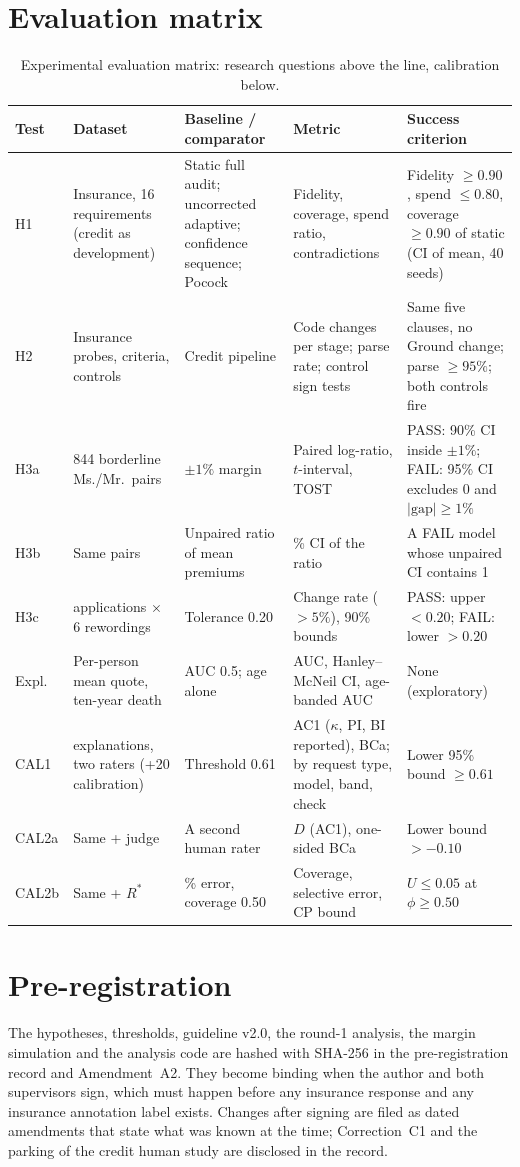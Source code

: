 \section{Evaluation matrix}
\begin{table}[H]
\centering
\caption{Experimental evaluation matrix: research questions above the line, calibration below.}
\label{tab:matrix}
\scriptsize
\begin{tabularx}{\textwidth}{@{}l>{\raggedright\arraybackslash}X>{\raggedright\arraybackslash}X>{\raggedright\arraybackslash}X>{\raggedright\arraybackslash}X@{}}
\toprule
Test & Dataset & Baseline / comparator & Metric & Success criterion \\
\midrule
H1 & Insurance, 16 requirements (credit as development) & Static full audit; uncorrected adaptive; confidence sequence; Pocock & Fidelity, coverage, spend ratio, contradictions & Fidelity $\ge0.90$, spend $\le0.80$, coverage $\ge0.90$ of static (CI of mean, 40 seeds) \\
H2 & Insurance probes, criteria, controls & Credit pipeline & Code changes per stage; parse rate; control sign tests & Same five clauses, no Ground change; parse $\ge95\%$; both controls fire \\
H3a & 2{,}844 borderline Ms./Mr.\ pairs & $\pm1\%$ margin & Paired log-ratio, $t$-interval, TOST & PASS: 90\% CI inside $\pm1\%$; FAIL: 95\% CI excludes 0 and $|\text{gap}|\ge1\%$ \\
H3b & Same pairs & Unpaired ratio of mean premiums & 95\% CI of the ratio & A FAIL model whose unpaired CI contains 1 \\
H3c & 725 applications $\times$ 6 rewordings & Tolerance 0.20 & Change rate ($>5\%$), 90\% bounds & PASS: upper $<0.20$; FAIL: lower $>0.20$ \\
Expl. & Per-person mean quote, ten-year death & AUC 0.5; age alone & AUC, Hanley--McNeil CI, age-banded AUC & None (exploratory) \\
\midrule
CAL1 & 240 explanations, two raters (+20 calibration) & Threshold 0.61 & AC1 ($\kappa$, PI, BI reported), BCa; by request type, model, band, check & Lower 95\% bound $\ge0.61$ \\
CAL2a & Same + judge & A second human rater & $D$ (AC1), one-sided BCa & Lower bound $>-0.10$ \\
CAL2b & Same + $R^{*}$ & 5\% error, coverage 0.50 & Coverage, selective error, CP bound & $U\le0.05$ at $\phi\ge0.50$ \\
\bottomrule
\end{tabularx}
\end{table}

\section{Pre-registration}
The hypotheses, thresholds, guideline v2.0, the round-1 analysis, the margin simulation and the analysis code are hashed with SHA-256 in the pre-registration record and Amendment~A2. They become binding when the author and both supervisors sign, which must happen before any insurance response and any insurance annotation label exists. Changes after signing are filed as dated amendments that state what was known at the time; Correction~C1 and the parking of the credit human study are disclosed in the record.
